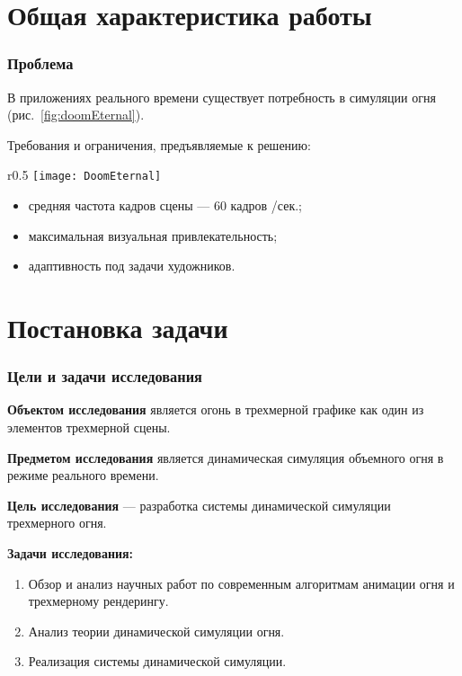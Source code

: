 \begin{frame}
\titlepage{}
\end{frame}

\section{Общая характеристика работы}

\begin{frame}
\frametitle{Проблема}
В приложениях реального времени существует потребность в симуляции огня
(рис.~\ref{fig:doomEternal}).

Требования и ограничения, предъявляемые к решению:
\begin{wrapfigure}{r}{0.5\textwidth}
	\centering
    \texttt{[image: DoomEternal]}
    \caption{Кадр из игры Doom Eternal}%
    \label{fig:doomEternal}
\end{wrapfigure}
\begin{itemize}
    \item средняя частота кадров сцены --- 60 кадров /сек.;
    \item максимальная визуальная привлекательность;
    \item адаптивность под задачи художников.
\end{itemize}
\end{frame}

\section{Постановка задачи}
\begin{frame}
\frametitle{Цели и задачи исследования}
\textbf{Объектом исследования} является огонь в трехмерной графике как один из
элементов трехмерной сцены.

\textbf{Предметом исследования} является динамическая симуляция объемного огня в
режиме реального времени.

\textbf{Цель исследования} --- разработка системы динамической симуляции
трехмерного огня.

\textbf{Задачи исследования:}
\begin{enumerate}
	\item Обзор и анализ научных работ по современным алгоритмам анимации огня и
        трехмерному рендерингу.
	\item Анализ теории динамической симуляции огня.
	\item Реализация системы динамической симуляции.
\end{enumerate}
\end{frame}


